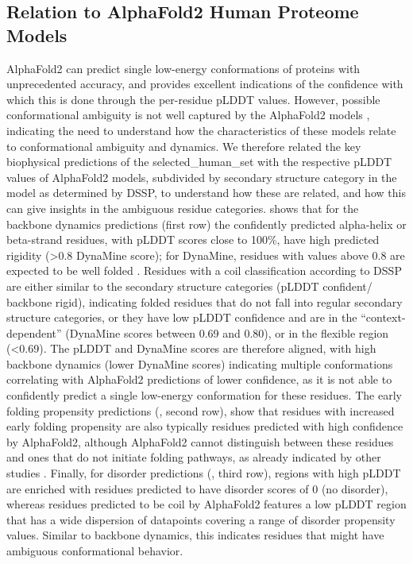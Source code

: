 \subsection{Relation to AlphaFold2 Human Proteome Models}
AlphaFold2 \cite{jumper_highly_2021} can predict single low-energy conformations of proteins with unprecedented accuracy, and provides excellent indications of the confidence with which this is done through the per-residue pLDDT values. However, possible conformational ambiguity is not well captured by the AlphaFold2 models \cite{chakravarty_alphafold2_2022}, indicating the need to understand how the characteristics of these models relate to conformational ambiguity and dynamics. We therefore related the key biophysical predictions of the selected_human_set with the respective pLDDT values of AlphaFold2 models, subdivided by secondary structure category in the model as determined by DSSP, to understand how these are related, and how this can give insights in the ambiguous residue categories.  shows that for the backbone dynamics predictions (first row) the confidently predicted alpha-helix or beta-strand residues, with pLDDT scores close to 100\%, have high predicted rigidity (>0.8 DynaMine score); for DynaMine, residues with values above 0.8 are expected to be well folded \cite{cilia_dynamine_2014}. Residues with a coil classification according to DSSP are either similar to the secondary structure categories (pLDDT confident/ backbone rigid), indicating folded residues that do not fall into regular secondary structure categories, or they have low pLDDT confidence and are in the ``context-dependent'' (DynaMine scores between 0.69 and 0.80), or in the flexible region (<0.69). The pLDDT and DynaMine scores are therefore aligned, with high backbone dynamics (lower DynaMine scores) indicating multiple conformations correlating with AlphaFold2 predictions of lower confidence, as it is not able to confidently predict a single low-energy conformation for these residues. The early folding propensity predictions (, second row), show that residues with increased early folding propensity are also typically residues predicted with high confidence by AlphaFold2, although AlphaFold2 cannot distinguish between these residues and ones that do not initiate folding pathways, as already indicated by other studies \cite{outeiral_current_2022}. Finally, for disorder predictions (, third row), regions with high pLDDT are enriched with residues predicted to have disorder scores of 0 (no disorder), whereas residues predicted to be coil by AlphaFold2 features a low pLDDT region that has a wide dispersion of datapoints covering a range of disorder propensity values. Similar to backbone dynamics, this indicates residues that might have ambiguous conformational behavior.

